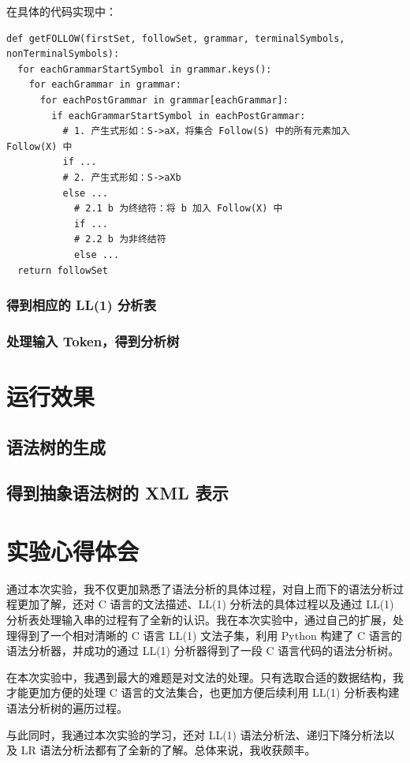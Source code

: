 \documentclass[UTF8]{ctexart}
\begin{document}
在具体的代码实现中：

\begin{verbatim}
def getFOLLOW(firstSet, followSet, grammar, terminalSymbols, nonTerminalSymbols):
  for eachGrammarStartSymbol in grammar.keys():
    for eachGrammar in grammar:
      for eachPostGrammar in grammar[eachGrammar]:
        if eachGrammarStartSymbol in eachPostGrammar:
          # 1. 产生式形如：S->aX，将集合 Follow(S) 中的所有元素加入 Follow(X) 中
          if ...
          # 2. 产生式形如：S->aXb
          else ...
            # 2.1 b 为终结符：将 b 加入 Follow(X) 中
            if ...
            # 2.2 b 为非终结符
            else ...
  return followSet
\end{verbatim}

\subsubsection{得到相应的 LL(1) 分析表}

\subsubsection{处理输入 Token，得到分析树}

\section{运行效果}
\subsection{语法树的生成}

\subsection{得到抽象语法树的 XML 表示}

\section{实验心得体会}
通过本次实验，我不仅更加熟悉了语法分析的具体过程，对自上而下的语法分析过程更加了解，还对 C 语言的文法描述、LL(1) 分析法的具体过程以及通过 LL(1) 分析表处理输入串的过程有了全新的认识。我在本次实验中，通过自己的扩展，处理得到了一个相对清晰的 C 语言 LL(1) 文法子集，利用 Python 构建了 C 语言的语法分析器，并成功的通过 LL(1) 分析器得到了一段 C 语言代码的语法分析树。

在本次实验中，我遇到最大的难题是对文法的处理。只有选取合适的数据结构，我才能更加方便的处理 C 语言的文法集合，也更加方便后续利用 LL(1) 分析表构建语法分析树的遍历过程。

与此同时，我通过本次实验的学习，还对 LL(1) 语法分析法、递归下降分析法以及 LR 语法分析法都有了全新的了解。总体来说，我收获颇丰。
\end{document}
